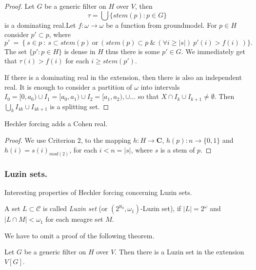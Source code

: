 \begin{proof}
 Let $G$ be a generic filter on $H$ over $V$, then
$$
\tau = \bigcup \{ stem(p) : p \in G \}
$$
is a dominating real.Let $f : \omega \to \omega$ be a function from groundmodel.
For $p \in H$ consider $p' \subset p$, where
$$
p' \ = \ \{\ s \in p \ : \ s \subset stem(p) \ \mbox{or} \ (stem(p) \subset p \ \& \ (\forall i \geq |s|) \ p'(i) > f(i) \ )  \}.
$$
The set $\{p':p \in H \}$ is dense in $H$ thus there is some $p' \in G$. We immediately
get that $\tau(i) > f(i)$ for each $i \geq stem(p')$.

\smallskip

If there is a dominating real in the extension, then there is also an independent
real. It is enough to consider a partition of $\omega$ into intervals
$I_0 = [0,a_0) \cup I_1 = [a_0,a_1) \cup I_2 = [a_1,a_2), \cup \dots$ so that
$X \cap I_k \cup I_{k+1} \not = \emptyset$. Then $\bigcup_k I_{4k} \cup I_{4k+1}$
is a splitting set.
\end{proof}

\begin{fact}
 Hechler forcing adds a Cohen real.
\end{fact}

\begin{proof}
 We use Criterion 2, to the mapping $h : H \to \mathbf C$,
 $h(p) : n \to \{ 0,1 \}$ and $h(i) = s(i)_{mod(2)}$, for each $i < n = |s|$,
 where  $s$ is a stem of $p$.
\end{proof}



\subsubsection{Luzin sets.}

Interesting properties of Hechler forcing concerning Luzin sets.

\begin{definition}
 A set $L \subset \mathcal C$ is called \emph{Luzin set}
(or $(2^{\aleph_0},\omega_1)$-Luzin set), if $|L| = 2^\omega$
and $|L\cap M| < \omega_1$ for each meagre set $M$.
\end{definition}

We have to omit a proof of the following theorem.

\begin{theorem}
 Let $G$ be a generic filter on $H$ over $V$. Then there is
a Luzin set in the extension $V[G]$.
\end{theorem}

